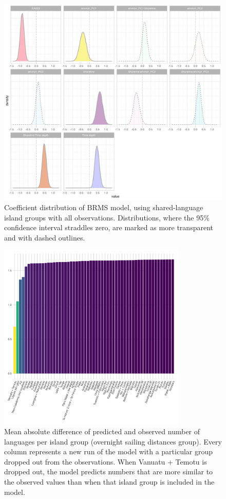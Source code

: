 \documentclass[unnumsec,webpdf,modern,medium]{oup-authoring-template}
\begin{document}
\begin{appendices}
\begin{figure}[ht]
\includegraphics[width=\textwidth]{brms_medium_group_full_effect_ridge_panels_plot}
\caption{Coefficient distribution of BRMS model, using shared-language island groups with all observations. Distributions, where the 95\% confidence interval straddles zero, are marked as more transparent and with dashed outlines.}
\label{brms_medium_group_full_effect_ridge_panels}
\end{figure}

\begin{figure}[ht]
\centering

\includegraphics[width=0.8\textwidth]{brms_SBZR_dropped_out_plot_diff}
\caption{Mean absolute difference of predicted and observed number of languages per island group (overnight sailing distances group). Every column represents a new run of the model with a particular group dropped out from the observations. When Vanuatu + Temotu is dropped out, the model predicts numbers that are more similar to the observed values than when that island group is included in the model.}
\label{brms_SBZR_dropped_out_plot_diff}
\end{figure}


\end{appendices}
\end{document}
